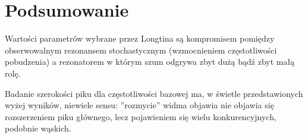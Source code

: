 \documentclass[12pt]{article}
\begin{document}
  \section{Podsumowanie}

  Wartości parametrów wybrane przez Longtina są kompromisem pomiędzy obserwowalnym rezonansem stochastycznym (wzmocnieniem częstotliwości pobudzenia) a rezonatorem w którym szum odgrywa zbyt dużą bądź zbyt małą rolę.
  
  Badanie szerokości piku dla częstotliwości bazowej ma, w świetle przedstawionych wyżej wyników, niewiele sensu: ''rozmycie'' widma objawia nie objawia się rozszerzeniem piku głównego, lecz pojawieniem się wielu konkurencyjnych, podobnie wąskich.
  
\end{document}
